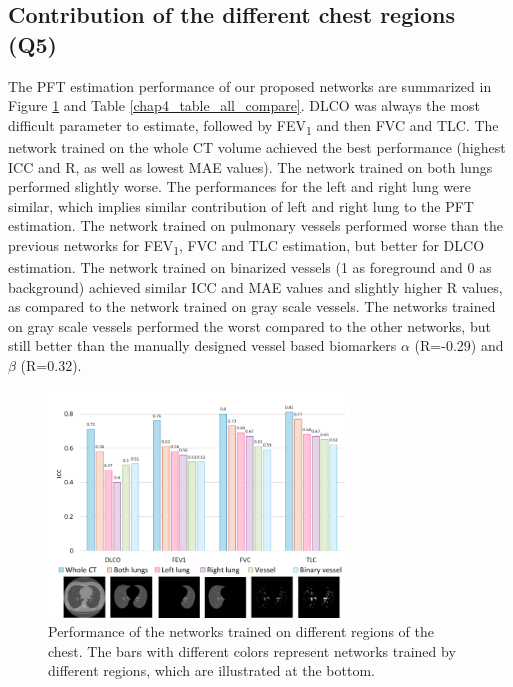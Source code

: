 \subsection{Contribution of the different chest regions (Q5)}
The PFT estimation performance of our proposed networks are summarized in Figure \ref{fig:chap4_bar} and Table \ref{chap4_table_all_compare}. DLCO was always the most difficult parameter to estimate, followed by FEV\textsubscript{1} and then FVC and TLC. The network trained on the whole CT volume achieved the best performance (highest ICC and R, as well as lowest MAE values). The network trained on both lungs performed slightly worse. The performances for the left and right lung were similar, which implies similar contribution of left and right lung to the PFT estimation. The network trained on pulmonary vessels performed worse than the previous networks for FEV\textsubscript{1}, FVC and TLC estimation, but better for DLCO estimation. The network trained on binarized vessels (1 as foreground and 0 as background) achieved similar ICC and MAE values and slightly higher R values, as compared to the network trained on gray scale vessels. The networks trained on gray scale vessels performed the worst compared to the other networks, but still better than the manually designed vessel based biomarkers $\alpha$ (R=-0.29) and $\beta$ (R=0.32).

\begin{figure}[tb]
    \centering
    \includegraphics[width=8cm]{bar.png}
    \caption{Performance of the networks trained on different regions of the chest. The bars with different colors represent networks trained by different regions, which are illustrated at the bottom.}
    \label{fig:chap4_bar}
\end{figure}


